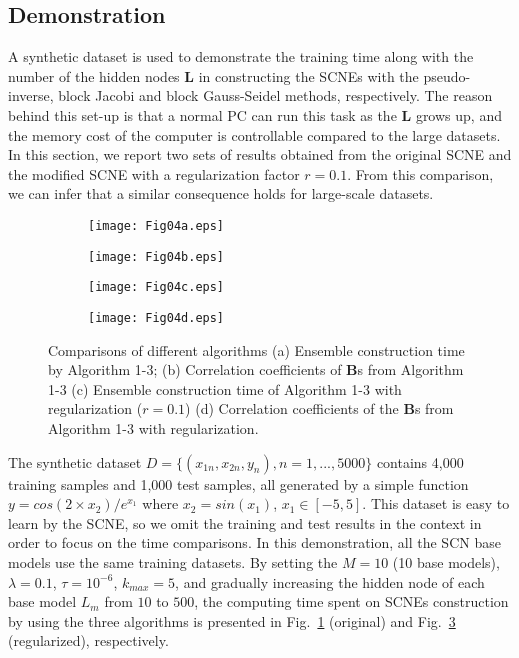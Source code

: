 \documentclass{article}
\begin{document}
\subsection{Demonstration}
\label{CompareAlgorithms}
A  synthetic dataset is used to demonstrate  the training time along with the number of the hidden nodes $\bm{L}$ in constructing the SCNEs with the pseudo-inverse, block Jacobi and block Gauss-Seidel methods, respectively. The reason behind  this set-up is that a normal PC can run this task as the $\bm{L}$ grows up, and the memory cost of the computer is controllable compared to the large datasets. In this section, we report two sets of results obtained from the original SCNE and the modified SCNE with a regularization factor $r=0.1$. From this comparison, we can infer that a similar consequence holds for 
 large-scale datasets. 
\begin{figure}[h!]
\centering
    \begin{subfigure}[b]{0.49\textwidth}
        \texttt{[image: Fig04a.eps]}
        \caption{ }
        \label{Fig04a}    
    \end{subfigure}
    \begin{subfigure}[b]{0.49\textwidth}
        \texttt{[image: Fig04b.eps]}
        \caption{ }
        \label{Fig04b}    
    \end{subfigure}        
    \begin{subfigure}[b]{0.49\textwidth}
        \texttt{[image: Fig04c.eps]}
        \caption{ }
        \label{Fig04c}    
    \end{subfigure}
    \begin{subfigure}[b]{0.49\textwidth}
        \texttt{[image: Fig04d.eps]}
        \caption{ }
        \label{Fig04d}    
    \end{subfigure}               
\caption{ Comparisons of different algorithms (a) Ensemble construction time by Algorithm 1-3; (b) Correlation coefficients of $\mathbf{B}$s from Algorithm 1-3 (c)  Ensemble construction time of Algorithm 1-3 with regularization ($r = 0.1$) (d) Correlation coefficients of the $\mathbf{B}$s from Algorithm 1-3 with regularization.}
\label{Fig04:CompareAlgorithms}
\end{figure}

The synthetic dataset $D = \{ (x_{1n},x_{2n}, y_n), n =1,...,5000\}$ contains 4,000 training samples and 1,000 test samples, all generated by a simple function $y=cos(2\times x_2)/e^{x_1}$ where $x_2 = sin(x_1)$, $x_1 \in [-5,5]$.  
This dataset is easy to learn by the SCNE, so we omit the training and test results in the context in order to focus on the time comparisons.
In this demonstration, all the SCN base models use the same training datasets.
By setting the $M=10$ (10 base models), $\lambda = 0.1$, $\tau = 10^{-6}$, $k_{max} = 5$, and gradually increasing the hidden node of each base model $L_m$ from $10$ to $500$, the computing time spent on SCNEs construction by using the three algorithms is presented in Fig.~\ref{Fig04a} (original) and Fig.~\ref{Fig04c} (regularized), respectively.
\end{document}
